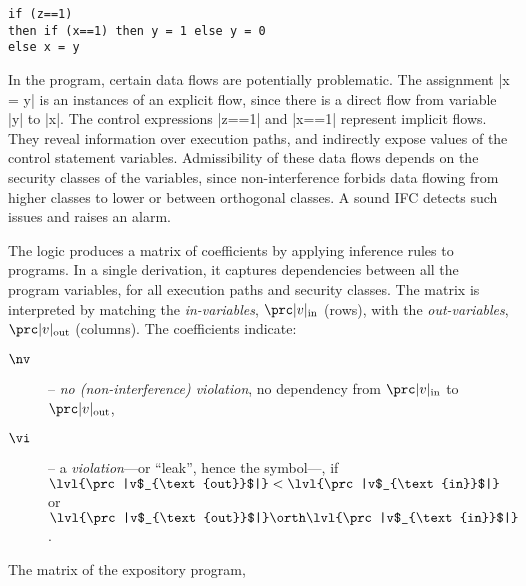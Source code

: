 \noindent\begin{center} %
\begin{minipage}{\textwidth} %
\begin{lstlisting}
if (z==1)
then if (x==1) then y = 1 else y = 0
else x = y
\end{lstlisting}
\end{minipage}\end{center}
In the program, certain data flows are potentially problematic.
The assignment \prc|x = y| is an instances of an explicit flow, since there is a direct flow from variable \prc|y| to \prc|x|.
The control expressions \prc|z==1| and \prc|x==1| represent implicit flows.
They reveal information over execution paths, and indirectly expose values of the control statement variables.
Admissibility of these data flows depends on the security classes of the variables, since non-interference forbids data flowing from higher classes to lower or between orthogonal classes.
A sound IFC detects such issues and raises an alarm.

The logic \lname produces a matrix of coefficients by applying inference rules to programs.
In a single derivation, it captures dependencies between all the program variables, for all execution paths and security classes.
The matrix is interpreted by matching the \emph{in-variables}, \(\prc|v|_{\text{in}}\) (rows), with the \emph{out-variables},
\(\prc|v|_{\text{out}}\) (columns).
The coefficients indicate:
\begin{description}
\item[\(\nv\)] -- \emph{no \emph{(non-interference)} violation}, no dependency from $\prc|v|_{\text{in}}$ to $\prc|v|_{\text{out}}$,
\item[\(\vi\)]  -- a \emph{violation}---or \enquote{leak}, hence the symbol---, if \(\lvl{\prc|v$_{\text{out}}$|} < \lvl{\prc|v$_{\text{in}}$|}\) or \(\lvl{\prc|v$_{\text{out}}$|} \orth \lvl{\prc|v$_{\text{in}}$|}\).
\end{description}

The matrix of the expository program,

